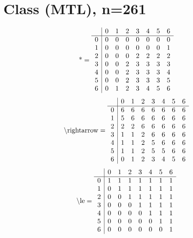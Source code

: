 \documentclass[11pt]{article}
\begin{document}
\section{Class (MTL), n=261}
\[\text{*} = 
\begin{array}{r | r r r r r r r}
 & 0 & 1 & 2 & 3 & 4 & 5 & 6 \\ \hline
0 & 0 & 0 & 0 & 0 & 0 & 0 & 0 \\
1 & 0 & 0 & 0 & 0 & 0 & 0 & 1 \\
2 & 0 & 0 & 0 & 2 & 2 & 2 & 2 \\
3 & 0 & 0 & 2 & 3 & 3 & 3 & 3 \\
4 & 0 & 0 & 2 & 3 & 3 & 3 & 4 \\
5 & 0 & 0 & 2 & 3 & 3 & 3 & 5 \\
6 & 0 & 1 & 2 & 3 & 4 & 5 & 6 \\
\end{array}
\]
\[\text{\textbackslash rightarrow} = 
\begin{array}{r | r r r r r r r}
 & 0 & 1 & 2 & 3 & 4 & 5 & 6 \\ \hline
0 & 6 & 6 & 6 & 6 & 6 & 6 & 6 \\
1 & 5 & 6 & 6 & 6 & 6 & 6 & 6 \\
2 & 2 & 2 & 6 & 6 & 6 & 6 & 6 \\
3 & 1 & 1 & 2 & 6 & 6 & 6 & 6 \\
4 & 1 & 1 & 2 & 5 & 6 & 6 & 6 \\
5 & 1 & 1 & 2 & 5 & 5 & 6 & 6 \\
6 & 0 & 1 & 2 & 3 & 4 & 5 & 6 \\
\end{array}
\]
\[\text{\textbackslash le} = 
\begin{array}{r | r r r r r r r}
 & 0 & 1 & 2 & 3 & 4 & 5 & 6 \\ \hline
0 & 1 & 1 & 1 & 1 & 1 & 1 & 1 \\
1 & 0 & 1 & 1 & 1 & 1 & 1 & 1 \\
2 & 0 & 0 & 1 & 1 & 1 & 1 & 1 \\
3 & 0 & 0 & 0 & 1 & 1 & 1 & 1 \\
4 & 0 & 0 & 0 & 0 & 1 & 1 & 1 \\
5 & 0 & 0 & 0 & 0 & 0 & 1 & 1 \\
6 & 0 & 0 & 0 & 0 & 0 & 0 & 1 \\
\end{array}
\]
\end{document}
